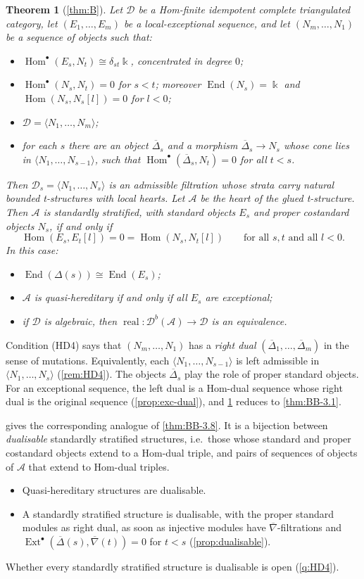 \documentclass[11pt,reqno]{amsart}
\theoremstyle{plain}
\newtheorem{maintheorem}{Theorem}
\theoremstyle{definition}
\theoremstyle{remark}
\newcommand{\kk}{\Bbbk}
\DeclareMathOperator{\Hom}{Hom}
\DeclareMathOperator{\End}{End}
\DeclareMathOperator{\Ext}{Ext}
\DeclareMathOperator{\real}{real}
\newcommand{\Db}{\mathcal{D}^b}
\newcommand{\thick}[1]{\langle #1\rangle}
\newcommand{\nablabar}{\overline{\nabla}}
\newcommand{\Deltabar}{\overline{\Delta}}
\newcommand{\cD}{\mathcal{D}}
\newcommand{\cA}{\mathcal{A}}
\begin{document}
\begin{maintheorem}[\cref{thm:B}]\label{mthm:B}
Let $\cD$ be a Hom-finite idempotent complete triangulated category, let $(E_1,\dots,E_m)$ be a local-exceptional sequence, and let $(N_m,\dots,N_1)$ be a sequence of objects such that:
\begin{itemize}
\item[\textup{(HD1)}] $\Hom^\bullet(E_s,N_t)\cong\delta_{st}\kk$, concentrated in degree $0$;
\item[\textup{(HD2)}] $\Hom^\bullet(N_s,N_t)=0$ for $s<t$; moreover $\End(N_s)=\kk$ and $\Hom(N_s,N_s[l])=0$ for $l<0$;
\item[\textup{(HD3)}] $\cD=\thick{N_1,\dots,N_m}$;
\item[\textup{(HD4)}] for each $s$ there are an object $\Deltabar_s$ and a morphism $\Deltabar_s\to N_s$ whose cone lies in $\thick{N_1,\dots,N_{s-1}}$, such that $\Hom^\bullet(\Deltabar_s,N_t)=0$ for all $t<s$.
\end{itemize}
Then $\cD_s=\thick{N_1,\dots,N_s}$ is an admissible filtration whose strata carry natural bounded t-structures with local hearts. Let $\cA$ be the heart of the glued t-structure. Then $\cA$ is standardly stratified, with standard objects $E_s$ and proper costandard objects $N_s$, if and only if
\[\Hom(E_s,E_t[l])=0=\Hom(N_s,N_t[l])\qquad\text{for all $s,t$ and all $l<0$.}\]
In this case:
\begin{itemize}
\item $\End(\Delta(s))\cong\End(E_s)$;
\item $\cA$ is quasi-hereditary if and only if all $E_s$ are exceptional;
\item if $\cD$ is algebraic, then $\real\colon\Db(\cA)\to\cD$ is an equivalence.
\end{itemize}
\end{maintheorem}

Condition (HD4) says that $(N_m,\dots,N_1)$ has a \emph{right dual} $(\Deltabar_1,\dots,\Deltabar_m)$ in the sense of mutations. Equivalently, each $\thick{N_1,\dots,N_{s-1}}$ is left admissible in $\thick{N_1,\dots,N_s}$ (\cref{rem:HD4}). The objects $\Deltabar_s$ play the role of proper standard objects. For an exceptional sequence, the left dual is a Hom-dual sequence whose right dual is the original sequence (\cref{prop:exc-dual}), and \cref{mthm:B} reduces to \cref{thm:BB-3.1}.

 gives the corresponding analogue of \cref{thm:BB-3.8}. It is a bijection between \emph{dualisable} standardly stratified structures, i.e.\ those whose standard and proper costandard objects extend to a Hom-dual triple, and pairs of sequences of objects of $\cA$ that extend to Hom-dual triples.
\begin{itemize}
\item Quasi-hereditary structures are dualisable.
\item A standardly stratified structure is dualisable, with the proper standard modules as right dual, as soon as injective modules have $\nablabar$-filtrations and $\Ext^\bullet(\Deltabar(s),\nablabar(t))=0$ for $t<s$ (\cref{prop:dualisable}).
\end{itemize}
Whether every standardly stratified structure is dualisable is open (\cref{q:HD4}).
\end{document}
